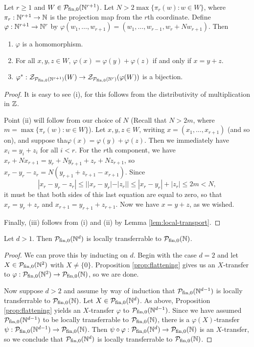\begin{prop}\label{prop:flattening}
Let $r \ge 1$ and $W\in \mathcal{P}_{\textrm{fin}, 0}(\mathbb{N}^{r+1})$.
Let $N > 2 \max\{\pi_r(w): w\in W\}$, where $\pi_r: \mathbb{N}^{r+1} \to \mathbb{N}$ is the projection map from the $r$th coordinate.
Define $\varphi: \mathbb{N}^{r+1} \to \mathbb{N}^r$ by $\varphi(w_1,\dots, w_{r+1}) = (w_1,\dots, w_{r-1},w_r + N w_{r+1})$.
Then
\begin{enumerate}[label={\rm (\roman{*})}]
	\item $\varphi$ is a homomorphism.
	\item For all $x,y,z\in W$, $\varphi(x) = \varphi(y) + \varphi(z)$ if and only if $x = y + z$.
	\item $\varphi^*:\mathcal{Z}_{\mathcal{P}_{\textrm{fin}, 0}(\mathbb{N}^{r+1})}(W) \to \mathcal{Z}_{\mathcal{P}_{\textrm{fin}, 0}(\mathbb{N}^r)}(\varphi(W))$ is a bijection.
\end{enumerate}
\end{prop}
\begin{proof}
It is easy to see (i), for this follows from the distributivity of multiplication in $\mathbb{Z}$.

Point (ii) will follow from our choice of $N$ (Recall that $N > 2m$, where $m = \max\{\pi_r(w): w\in W\}$).
Let $x,y,z\in W$, writing $x = (x_1,\dots, x_{r+1})$ (and so on), and suppose tha$\varphi(x) = \varphi(y) + \varphi(z)$.
Then we immediately have $x_i = y_i + z_i$ for all $i < r$.
For the $r$th component, we have $x_r + Nx_{r+1} = y_r + Ny_{r+1} + z_r + Nz_{r+1}$, so
$x_r -y_r - z_r = N(y_{r+1}+z_{r+1}-x_{r+1})$.
Since 
\[|x_r - y_r - z_r| \le | |x_r - y_r| - |z_r| | \le |x_r-y_r| + |z_r| \le 2m < N,\]
it must be that both sides of this last equation are equal to zero, so that $x_r = y_r + z_r$ and $x_{r+1} = y_{r+1}+z_{r+1}$.
Now we have $x = y+z$, as we wished.

Finally, (iii) follows from (i) and (ii) by Lemma \ref{lem:local-transport}.
\end{proof}

\begin{thm}\label{thm:passage-to-Nd}
Let $d > 1$. 
Then $\mathcal{P}_{\textrm{fin}, 0}(\mathbb{N}^d)$ is locally transferrable to ${\mathcal{P}_{\textrm{fin},0}(\mathbb{N})}$.
\end{thm}
\begin{proof}
We can prove this by inducting on $d$.
Begin with the case $d=2$ and let $X\in \mathcal{P}_{\textrm{fin}, 0}(\mathbb{N}^2)$ with $X \neq \{0\}$.
Proposition \ref{prop:flattening} gives us an $X$-transfer to $\varphi:\mathcal{P}_{\textrm{fin}, 0}(\mathbb{N}^2) \to {\mathcal{P}_{\textrm{fin},0}(\mathbb{N})}$, so we are done.

Now suppose $d>2$ and assume by way of induction that $\mathcal{P}_{\textrm{fin}, 0}(\mathbb{N}^{d-1})$ is locally transferrable to ${\mathcal{P}_{\textrm{fin},0}(\mathbb{N})}$.
Let $X\in \mathcal{P}_{\textrm{fin}, 0}(\mathbb{N}^{d})$.
As above, Proposition \ref{prop:flattening} yields an $X$-transfer $\varphi$ to $\mathcal{P}_{\textrm{fin}, 0}(\mathbb{N}^{d-1})$.
Since we have assumed $\mathcal{P}_{\textrm{fin}, 0}(\mathbb{N}^{d-1})$ to be locally transferrable to ${\mathcal{P}_{\textrm{fin},0}(\mathbb{N})}$, there is a $\varphi(X)$-transfer $\psi: \mathcal{P}_{\textrm{fin}, 0}(\mathbb{N}^{d-1}) \to {\mathcal{P}_{\textrm{fin},0}(\mathbb{N})}$.
Then $\psi\circ\varphi: \mathcal{P}_{\textrm{fin}, 0}(\mathbb{N}^d) \to {\mathcal{P}_{\textrm{fin},0}(\mathbb{N})}$ is an $X$-transfer, so we conclude that $\mathcal{P}_{\textrm{fin}, 0}(\mathbb{N}^d)$ is locally transferrable to ${\mathcal{P}_{\textrm{fin},0}(\mathbb{N})}$.
\end{proof}


